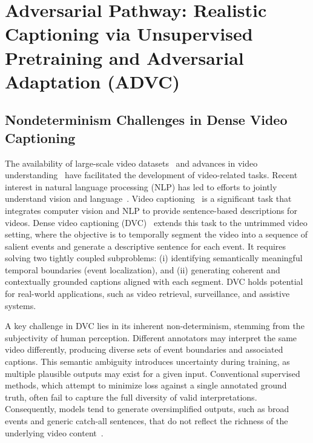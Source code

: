 
\chapter{Adversarial Pathway: Realistic Captioning via Unsupervised Pretraining and Adversarial Adaptation (ADVC)}
\label{chap:adversarial_pathway}

\section{Nondeterminism Challenges in Dense Video Captioning}

The availability of large-scale video datasets~\cite{Heilbron2015-ha,Abu-El-Haija2016-yh,Carreira2019-va} and advances in video understanding~\cite{Tran2015-uq,Feichtenhofer2019-mh,Arnab2021-gv} have facilitated the development of video-related tasks.
Recent interest in natural language processing (NLP) has led to efforts to jointly understand vision and language~\cite{Radford2021-kx,Luo2022-yq}.
Video captioning~\cite{Rohrbach2013-md} is a significant task that integrates computer vision and NLP to provide sentence-based descriptions for videos.
Dense video captioning (DVC)~\cite{Krishna2017-pw} extends this task to the untrimmed video setting, where the objective is to temporally segment the video into a sequence of salient events and generate a descriptive sentence for each event.
It requires solving two tightly coupled subproblems: (i) identifying semantically meaningful temporal boundaries (event localization), and (ii) generating coherent and contextually grounded captions aligned with each segment.
DVC holds potential for real-world applications, such as video retrieval, surveillance, and assistive systems\cite{Wajid2024-ab}.

A key challenge in DVC lies in its inherent non-determinism, stemming from the subjectivity of human perception.
Different annotators may interpret the same video differently, producing diverse sets of event boundaries and associated captions.
This semantic ambiguity introduces uncertainty during training, as multiple plausible outputs may exist for a given input. Conventional supervised methods, which attempt to minimize loss against a single annotated ground truth, often fail to capture the full diversity of valid interpretations.
Consequently, models tend to generate oversimplified outputs, such as broad events and generic catch-all sentences, that do not reflect the richness of the underlying video content~\cite{Summers2021-mz}.

